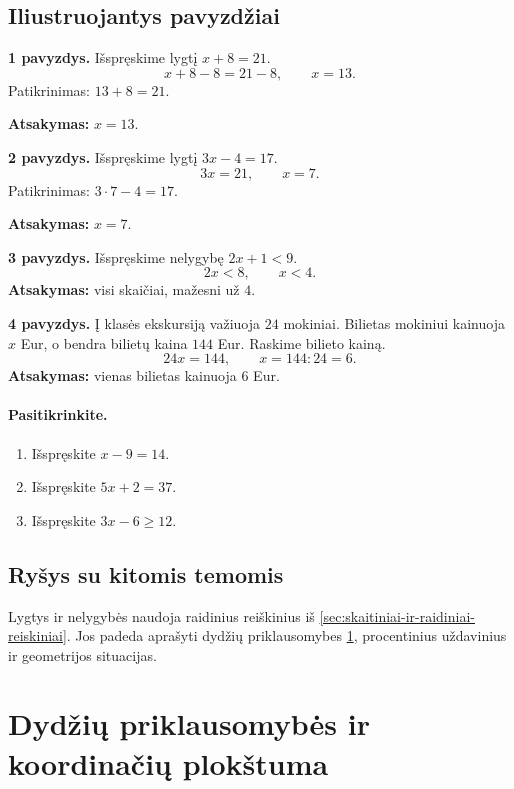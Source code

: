 \subsection{Iliustruojantys pavyzdžiai}
\textbf{1 pavyzdys.} Išspręskime lygtį \(x+8=21\).
\[
x+8-8=21-8,\qquad x=13.
\]
Patikrinimas: \(13+8=21\).

\textbf{Atsakymas:} \(x=13\).

\textbf{2 pavyzdys.} Išspręskime lygtį \(3x-4=17\).
\[
3x=21,\qquad x=7.
\]
Patikrinimas: \(3\cdot 7-4=17\).

\textbf{Atsakymas:} \(x=7\).

\textbf{3 pavyzdys.} Išspręskime nelygybę \(2x+1<9\).
\[
2x<8,\qquad x<4.
\]
\textbf{Atsakymas:} visi skaičiai, mažesni už \(4\).

\textbf{4 pavyzdys.} Į klasės ekskursiją važiuoja \(24\) mokiniai. Bilietas mokiniui kainuoja \(x\) Eur, o bendra bilietų kaina \(144\) Eur. Raskime bilieto kainą.
\[
24x=144,\qquad x=144:24=6.
\]
\textbf{Atsakymas:} vienas bilietas kainuoja \(6\) Eur.

\paragraph{Pasitikrinkite.}
\begin{enumerate}[label=\arabic*.]
\item Išspręskite \(x-9=14\).
\item Išspręskite \(5x+2=37\).
\item Išspręskite \(3x-6\ge 12\).
\end{enumerate}

\subsection{Ryšys su kitomis temomis}
Lygtys ir nelygybės naudoja raidinius reiškinius iš \ref{sec:skaitiniai-ir-raidiniai-reiskiniai}. Jos padeda aprašyti dydžių priklausomybes \ref{sec:dydziu-priklausomybes-ir-koordinaciu-plokstuma}, procentinius uždavinius ir geometrijos situacijas.

\section{Dydžių priklausomybės ir koordinačių plokštuma}\label{sec:dydziu-priklausomybes-ir-koordinaciu-plokstuma}

